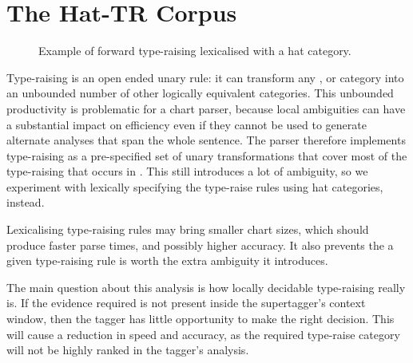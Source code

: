 \section{The Hat-TR Corpus}
\label{sec:hattr_corpus}
\begin{figure}
 \centering
{}
\caption{Example of forward type-raising lexicalised with a hat
category.\label{hattr_ftype}}
\end{figure}

Type-raising is an open ended unary rule: it can transform any ,
 or  category into an unbounded number of other
logically equivalent categories. This unbounded productivity is problematic for a
chart parser, because local ambiguities can have a substantial impact on efficiency
even if they cannot be used to generate alternate analyses that span the whole sentence.
The \candc parser therefore implements type-raising as a pre-specified
set of unary transformations that cover most of the type-raising that occurs in
\ccgbank. This still introduces a lot of ambiguity, so we experiment with
lexically specifying the type-raise rules using hat categories, instead.

Lexicalising type-raising rules may bring smaller chart sizes, which should
produce faster parse times, and possibly higher accuracy. It also prevents the
a given type-raising rule is worth the extra ambiguity it introduces.

The main question about this analysis is how locally decidable type-raising
really is. If the evidence required is not present inside the supertagger's
context window, then the tagger has little opportunity to make the right decision. This
will cause a reduction in speed and accuracy, as the required type-raise
category will not be highly ranked in the tagger's analysis.

